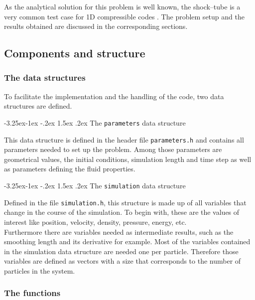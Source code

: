 \documentclass{report}
\makeatletter
\renewcommand\paragraph{\@startsection{paragraph}{4}{\z@}%
  {-3.25ex\@plus -1ex \@minus -.2ex}%
  {1.5ex \@plus .2ex}%
  {\normalfont\normalsize\bfseries}}
\makeatother
\begin{document}
As the analytical solution for this problem is well known, the shock--tube is a very 
common test case for 1D compressible codes \cite{Sod1978}.
The problem setup and the results obtained are discussed in the corresponding sections.

\subsection{Components and structure}
\label{sec:CompAndStruc1DCode}

\subsubsection{The data structures}

To facilitate the implementation and the handling of the code, two data structures are defined. 

\paragraph{The {\tt parameters} data structure}

This data structure is defined in the header file {\tt parameters.h} and 
contains all parameters needed to set up the problem. Among those parameters are 
geometrical values, the initial conditions, simulation length and time step 
as well as parameters defining the fluid properties.

\paragraph{The {\tt simulation} data structure}

Defined in the file {\tt simulation.h}, this structure is made up of all 
variables that change in the course of the simulation. To begin with, these are the 
values of interest like position, velocity, density, pressure, energy, etc.\\ 
Furthermore there are variables needed as intermediate results, such as the smoothing 
length and its derivative for example. 
Most of the variables contained in the simulation data structure are needed one per 
particle. Therefore those variables are defined as vectors with a size that corresponds 
to the number of particles in the system. 

\subsubsection{The functions}
\end{document}
